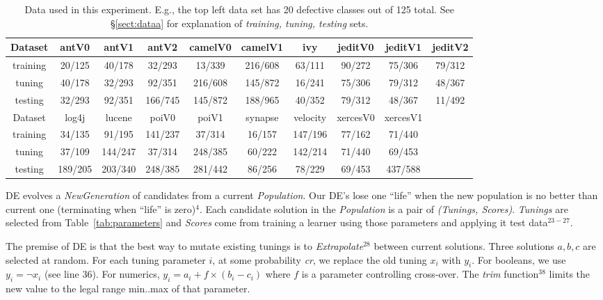 \documentclass{sig-alternative}
\newcommand{\tion}[1]{\S\ref{sect:#1}}
\newcommand{\tab}[1]{Table~\ref{tab:#1}}
\begin{document}
 \begin{table}[!t]

\renewcommand{\baselinestretch}{0.8}
\scriptsize
\centering
  \begin{tabular}{c c c c c c c c c c }\hline
  Dataset &antV0&antV1&antV2&camelV0&camelV1&ivy&jeditV0&jeditV1&jeditV2
\\\hline
  training &20/125 &40/178 &32/293 &13/339 &216/608 &63/111 &90/272 &75/306 &79/312
\\  tuning  &40/178 &32/293 &92/351 &216/608 &145/872 &16/241 &75/306 &79/312 &48/367
\\  testing &32/293 &92/351 &166/745 &145/872 &188/965 &40/352 &79/312 &48/367 &11/492
\\ \hline
  Dataset &log4j&lucene&poiV0&poiV1&synapse&velocity&xercesV0&xercesV1
\\\hline
  training &34/135 &91/195 &141/237 &37/314 &16/157 &147/196 &77/162 &71/440
\\  tuning  &37/109 &144/247 &37/314 &248/385 &60/222 &142/214 &71/440 &69/453
\\  testing &189/205 &203/340 &248/385 &281/442 &86/256 &78/229 &69/453 &437/588
\\  \end{tabular}

   \caption{Data used in this experiment. 
   E.g., the top left data set has 20 defective classes out of 125 total.
   See \tion{dataa} for explanation of {\em training, tuning, testing} sets.
   }\label{tab:data1}
\end{table} 

DE evolves a {\em NewGeneration} of candidates  from
a current {\em Population}.  Our DE's lose one ``life''
when the new population is no better than  current one (terminating when ``life'' is zero)$^{4}$.
Each candidate solution in the {\em Population}  
is a pair of {\em (Tunings, Scores)}.  {\em Tunings} are selected from
\tab{parameters} and {\em Scores} come from training a learner using those parameters
and applying it     test data$^{23-27}$.

The premise of DE  is that the best way to mutate existing tunings
is to {\em Extrapolate}$^{28}$
between current solutions.  Three solutions $a,b,c$ are selected at random.
For each tuning parameter $i$, at some probability {\em cr}, we replace
the old tuning $x_i$ with $y_i$. For booleans, we use $y_i= \neg x_i$ (see line 36). For numerics, $y_i = a_i+f \times (b_i - c_i)$   where $f$ is a parameter
controlling  cross-over.  The {\em trim} function$^{38}$ limits the new
value to the legal range min..max of that parameter.
 
\end{document}
